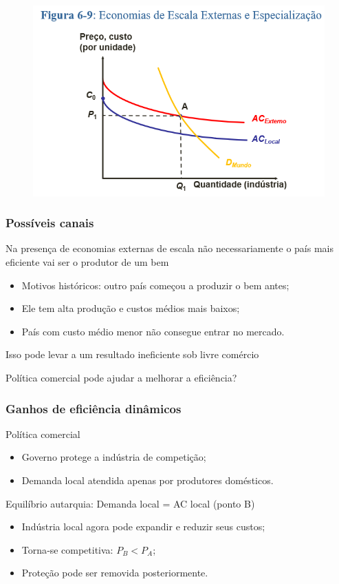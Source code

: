 \documentclass[a4paper,12pt]{article}[abntex2]
\begin{document}
\begin{figure}[H]
    \centering
    \includegraphics[width=0.7\linewidth]{Imagens/a18i3.png}
\end{figure}

\subsubsection{\textbf{Possíveis canais}}
Na presença de economias externas de escala não necessariamente o país mais eficiente vai ser o produtor de um bem
\begin{itemize}
    \item Motivos históricos: outro país começou a produzir o bem antes;
    \item Ele tem alta produção e custos médios mais baixos;
    \item País com custo médio menor não consegue entrar no mercado.
\end{itemize}

Isso pode levar a um resultado ineficiente sob livre comércio

Política comercial pode ajudar a melhorar a eficiência?

\subsubsection{\textbf{Ganhos de eficiência dinâmicos}}

Política comercial  
\begin{itemize}
  \item Governo protege a indústria de competição;
  \item Demanda local atendida apenas por produtores domésticos.
\end{itemize}

Equilíbrio autarquia: Demanda local = AC local (ponto B)  
\begin{itemize}
  \item Indústria local agora pode expandir e reduzir seus custos;
  \item Torna‐se competitiva: \(P_{B} < P_{A}\);
  \item Proteção pode ser removida posteriormente.
\end{itemize}
\end{document}
